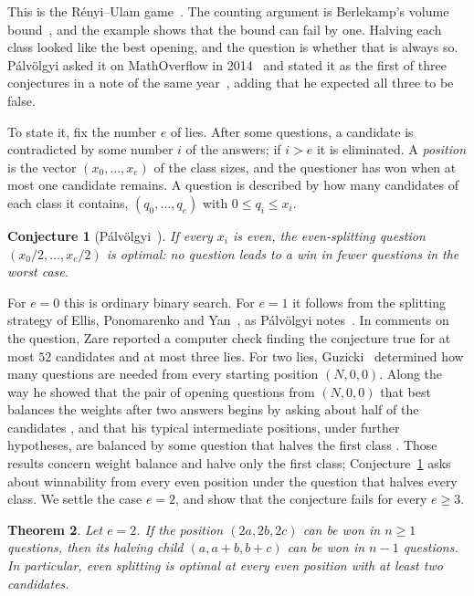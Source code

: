 \documentclass[11pt]{amsart}
\newtheorem{thm}{Theorem}[section]
\newtheorem{conj}[thm]{Conjecture}
\theoremstyle{definition}
\begin{document}
This is the R\'enyi--Ulam game~\cite{Pelc}. The counting argument is Berlekamp's volume bound~\cite{Berlekamp}, and
the example shows that the bound can fail by one. Halving each class looked like the best opening, and the question
is whether that is always so. P\'alv\"olgyi asked it on MathOverflow in 2014~\cite{MO} and stated it as the first of
three conjectures in a note of the same year~\cite{Palvolgyi}, adding that he expected all three to be false.

To state it, fix the number $e$ of lies. After some questions, a candidate is contradicted by some number $i$ of the
answers; if $i>e$ it is eliminated. A \emph{position} is the vector $(x_0,\dots,x_e)$ of the class sizes, and the
questioner has won when at most one candidate remains. A question is described by how many candidates of each class
it contains, $(q_0,\dots,q_e)$ with $0\le q_i\le x_i$.

\begin{conj}[P\'alv\"olgyi~\cite{MO,Palvolgyi}]\label{conj}
\sloppy If every $x_i$ is even, the even-splitting question $(x_0/2,\dots,x_e/2)$ is optimal: no question leads to a
win in fewer questions in the worst case.
\end{conj}

For $e=0$ this is ordinary binary search. For $e=1$ it follows from the splitting strategy of Ellis, Ponomarenko and
Yan~\cite{EPY}, as P\'alv\"olgyi notes~\cite{MO}. In comments on the question, Zare reported a computer check finding
the conjecture true for at most $52$ candidates and at most three lies. For two lies, Guzicki~\cite{Guzicki}
determined how many questions are needed from every starting position $(N,0,0)$. Along the way he showed that the
pair of opening questions from $(N,0,0)$ that best balances the weights after two answers begins by asking about half
of the candidates \cite[Theorem~4.1]{Guzicki}, and that his typical intermediate positions, under further hypotheses,
are balanced by some question that halves the first class \cite[Theorems~3.3--3.5]{Guzicki}. Those results concern
weight balance and halve only the first class; Conjecture~\ref{conj} asks about winnability from every even position
under the question that halves every class. We settle the case
$e=2$, and show that the conjecture fails for every $e\ge3$.

\begin{thm}\label{thm:main}
Let $e=2$. If the position $(2a,2b,2c)$ can be won in $n\ge1$ questions, then its halving child $(a,a+b,b+c)$ can be
won in $n-1$ questions. In particular, even splitting is optimal at every even position with at least two
candidates.
\end{thm}
\end{document}
